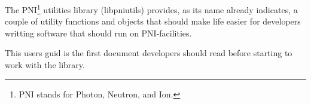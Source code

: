 
The PNI\footnote{PNI stands for Photon, Neutron, and Ion.} utilities library
(libpniutils) provides, as its name already indicates, a couple of utility 
functions and objects that should make  life easier for developers writting 
software that should run on PNI-facilities.

This users guid is the first document developers should read before starting 
to work with the library.  